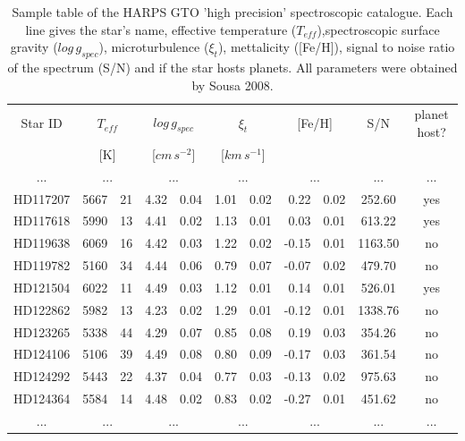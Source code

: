 \documentclass[dvips,12pt,a4paper]{report}
\begin{document}
{\begin{table}[h]
  \centering
\caption[Sample table of the HARPS GTO ``high precision'' spectroscopic catalogue.]{Sample table of the HARPS GTO 'high precision' spectroscopic catalogue. Each line gives the star's name, effective temperature ($T_{eff}$),spectroscopic surface gravity ($log\,g_{spec}$), microturbulence ($\xi_t$), mettalicity ([Fe/H]), signal to noise ratio of the spectrum (S/N) and if the star hosts planets. All parameters were obtained by Sousa 2008.}
  \label{cat_sample}
  \begin{tabular}{ c r@{$\pm$}l r@{$\pm$}l r@{$\pm$}l r@{$\pm$}l c c}
  \hline
  \hline
Star ID & \multicolumn {2}{c}{$T_{eff}$} & \multicolumn {2}{c}{$log\,g_{spec}$} & \multicolumn {2}{c}{$\xi_t$} & \multicolumn {2}{c}{[Fe/H]} & S/N & planet host? \\ 
& \multicolumn {2}{c}{[K]} & \multicolumn {2}{c}{[$cm\,s^{-2}$]} & \multicolumn {2}{c}{[$km\,s^{-1}$]} & \multicolumn {2}{c}{ } &  &  \\
\hline
... & \multicolumn {2}{c}{...} & \multicolumn {2}{c}{...} & \multicolumn {2}{c}{...} & \multicolumn {2}{c}{...} & ... & ... \\
HD117207 & 5667 & 21 & 4.32 & 0.04 & 1.01 & 0.02 & 0.22 & 0.02 & 252.60 & yes \\
HD117618 & 5990 & 13 & 4.41 & 0.02 & 1.13 & 0.01 & 0.03 & 0.01 & 613.22 & yes \\
HD119638 & 6069 & 16 & 4.42 & 0.03 & 1.22 & 0.02 & -0.15 & 0.01 & 1163.50 & no \\
HD119782 & 5160 & 34 & 4.44 & 0.06 & 0.79 & 0.07 & -0.07 & 0.02 & 479.70 & no \\
HD121504 & 6022 & 11 & 4.49 & 0.03 & 1.12 & 0.01 & 0.14 & 0.01 & 526.01 & yes \\
HD122862 & 5982 & 13 & 4.23 & 0.02 & 1.29 & 0.01 & -0.12 & 0.01 & 1338.76 & no \\
HD123265 & 5338 & 44 & 4.29 & 0.07 & 0.85 & 0.08 & 0.19 & 0.03 & 354.26 & no \\
HD124106 & 5106 & 39 & 4.49 & 0.08 & 0.80 & 0.09 & -0.17 & 0.03 & 361.54 & no \\
HD124292 & 5443 & 22 & 4.37 & 0.04 & 0.77 & 0.03 & -0.13 & 0.02 & 975.63 & no \\
HD124364 & 5584 & 14 & 4.48 & 0.02 & 0.83 & 0.02 & -0.27 & 0.01 & 451.62 & no \\
... & \multicolumn {2}{c}{...} & \multicolumn {2}{c}{...} & \multicolumn {2}{c}{...} & \multicolumn {2}{c}{...} & ... & ... \\
\hline
\end{tabular}
\end{table}





}
\end{document}
